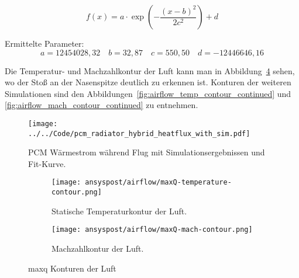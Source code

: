 \begin{equation*}
f(x) = a \cdot \exp\!\left(-\frac{(x-b)^2}{2c^2}\right) + d
\end{equation*}

Ermittelte Parameter:
\begin{equation*}
  a=12454028,32 \quad b=32,87 \quad c=550,50 \quad d=-12446646,16
\end{equation*}

\newpage

Die Temperatur- und Machzahlkontur der Luft kann man in Abbildung~\ref{fig:maxQ_konturen} sehen, wo der Stoß an der Nasenspitze
deutlich zu erkennen ist. Konturen der weiteren Simulationen sind den Abbildungen~\ref{fig:airflow_temp_contour_continued}
und \ref{fig:airflow_mach_contour_continued} zu entnehmen.

\begin{figure}
  \centering
  \texttt{[image: ../../Code/pcm\_radiator\_hybrid\_heatflux\_with\_sim.pdf]}
  \caption{PCM Wärmestrom während Flug mit Simulationsergebnissen und Fit-Kurve.}\label{fig:pcm_waermestrom_sim}
\end{figure}

\begin{figure}
    \centering

    \begin{subfigure}{\textwidth}
        \centering
        \texttt{[image: ansyspost/airflow/maxQ-temperature-contour.png]}
        \caption{Statische Temperaturkontur der Luft.}
        \label{fig:maxQ_temp_contour}
    \end{subfigure}

    \begin{subfigure}{\textwidth}
        \centering
        \texttt{[image: ansyspost/airflow/maxQ-mach-contour.png]}
        \caption{Machzahlkontur der Luft.}
        \label{fig:maxQ_mach_contour}
    \end{subfigure}

    \caption{\texorpdfstring{\acs{maxq}}{max Q} Konturen der Luft}
    \label{fig:maxQ_konturen}
\end{figure}